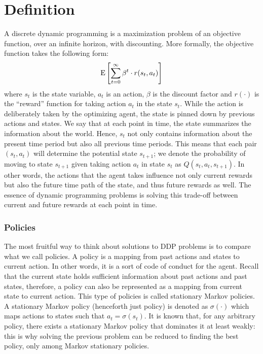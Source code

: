 \section{Definition}

A discrete dynamic programming is a maximization problem of an objective function, over an infinite horizon, with discounting. More formally, the objective function takes the following form: $$\operatorname{E}\left[\sum_{t = 0}^{\infty} \beta^t\cdot r(s_t, a_t) \right]$$ where $s_t$ is the state variable, $a_t$ is an action, $\beta$ is the discount factor and $r(\cdot)$ is the ``reward'' function for taking action $a_t$ in the state $s_t$. While the action is deliberately taken by the optimizing agent, the state is pinned down by previous actions and states. We say that at each point in time, the state summarizes the information about the world. Hence, $s_t$ not only contains information about the present time period but also all previous time periods. This means that each pair $(s_t, a_t)$ will determine the potential state $s_{t+1}$; we denote the probability of moving to state $s_{t+1}$ given taking action $a_t$ in state $s_t$ as $Q(s_t, a_t, s_{t+1})$. In other words, the actions that the agent takes influence not only current rewards but also the future time path of the state, and thus future rewards as well. The essence of dynamic programming problems is solving this trade-off between current and future rewards at each point in time.

\subsubsection{Policies}

The most fruitful way to think about solutions to DDP problems is to compare what we call policies. A policy is a mapping from past actions and states to current action. In other words, it is a sort of code of conduct for the agent. Recall that the current state holds sufficient information about past actions and past states, therefore, a policy can also be represented as a mapping from current state to current action. This type of policies is called stationary Markov policies. A stationary Markov policy (henceforth just policy) is denoted as $\sigma(\cdot)$ which maps actions to states such that $a_t = \sigma(s_t)$. It is known that, for any arbitrary policy, there exists a stationary Markov policy that dominates it at least weakly: this is why solving the previous problem can be reduced to finding the best policy, only among Markov stationary policies.

